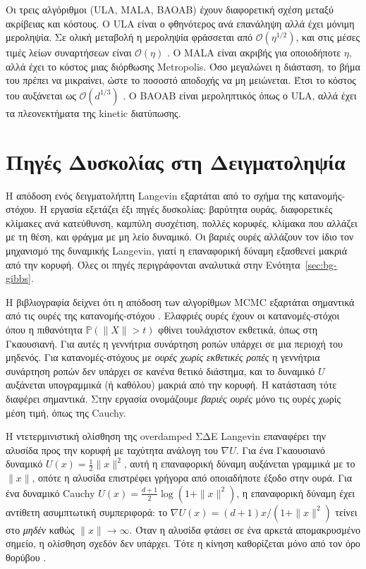 Οι τρεις αλγόριθμοι (ULA, MALA, BAOAB) έχουν διαφορετική σχέση
μεταξύ ακρίβειας και κόστους. Ο ULA είναι ο φθηνότερος ανά
επανάληψη αλλά έχει μόνιμη μεροληψία. Σε ολική μεταβολή η μεροληψία φράσσεται από
$\mathcal{O}(\eta^{1/2})$, και στις μέσες τιμές λείων συναρτήσεων είναι $\mathcal{O}(\eta)$
\citep{durmus2017nonasymptotic}.
Ο MALA είναι ακριβής για οποιοδήποτε $\eta$, αλλά έχει το κόστος μιας
διόρθωσης Metropolis. Όσο μεγαλώνει η διάσταση, το βήμα του πρέπει να μικραίνει,
ώστε το ποσοστό αποδοχής να μη μειώνεται. Έτσι το κόστος του αυξάνεται ως
$\mathcal{O}(d^{1/3})$
\citep{roberts1998optimal}. Ο BAOAB είναι μεροληπτικός όπως ο ULA, αλλά έχει
τα πλεονεκτήματα της kinetic διατύπωσης.

\section{Πηγές Δυσκολίας στη Δειγματοληψία}
\label{sec:intro-tails}

Η απόδοση ενός δειγματολήπτη Langevin εξαρτάται από το σχήμα της κατανομής-στόχου.
Η εργασία εξετάζει έξι πηγές δυσκολίας: βαρύτητα ουράς, διαφορετικές κλίμακες ανά
κατεύθυνση, καμπύλη συσχέτιση, πολλές κορυφές, κλίμακα που αλλάζει με τη θέση, και
φράγμα με μη λείο δυναμικό. Οι βαριές ουρές αλλάζουν τον ίδιο τον μηχανισμό της
δυναμικής Langevin, γιατί η επαναφορική δύναμη εξασθενεί μακριά από την κορυφή.
Όλες οι πηγές περιγράφονται αναλυτικά στην Ενότητα~\ref{sec:bg-gibbs}.

Η βιβλιογραφία δείχνει ότι η απόδοση των αλγορίθμων MCMC εξαρτάται
σημαντικά από τις ουρές της κατανομής-στόχου \citep{jarner2007convergence}. Ελαφριές ουρές έχουν οι κατανομές-στόχοι όπου η πιθανότητα
$\mathbb{P}(\|X\| > t)$ φθίνει τουλάχιστον εκθετικά, όπως στη Γκαουσιανή. Για αυτές η
γεννήτρια συνάρτηση ροπών υπάρχει σε μια περιοχή του μηδενός. Για κατανομές-στόχους με \emph{ουρές χωρίς εκθετικές ροπές} η γεννήτρια
συνάρτηση ροπών δεν υπάρχει σε κανένα θετικό διάστημα, και το δυναμικό $U$
αυξάνεται υπογραμμικά (ή καθόλου) μακριά από την κορυφή. Η κατάσταση τότε διαφέρει
σημαντικά. Στην εργασία ονομάζουμε \emph{βαριές ουρές} μόνο τις ουρές χωρίς μέση
τιμή, όπως της Cauchy.

Η ντετερμινιστική ολίσθηση της overdamped ΣΔΕ
Langevin επαναφέρει την αλυσίδα προς την κορυφή με ταχύτητα ανάλογη του
$\nabla U$. Για ένα Γκαουσιανό δυναμικό $U(x) = \tfrac12 \|x\|^2$, αυτή η
επαναφορική δύναμη αυξάνεται γραμμικά με το $\|x\|$, οπότε η αλυσίδα επιστρέφει
γρήγορα από οποιαδήποτε έξοδο στην ουρά. Για ένα δυναμικό Cauchy
$U(x) = \tfrac{d+1}{2}\log(1 + \|x\|^2)$, η επαναφορική δύναμη έχει αντίθετη
ασυμπτωτική συμπεριφορά: το $\nabla U(x) = (d+1) x / (1 + \|x\|^2)$ τείνει στο
\emph{μηδέν} καθώς $\|x\|\to\infty$. Όταν η αλυσίδα φτάσει σε ένα αρκετά
απομακρυσμένο σημείο, η ολίσθηση σχεδόν δεν υπάρχει. Τότε η κίνηση καθορίζεται
μόνο από τον όρο θορύβου \citep{jarner2007convergence}.

